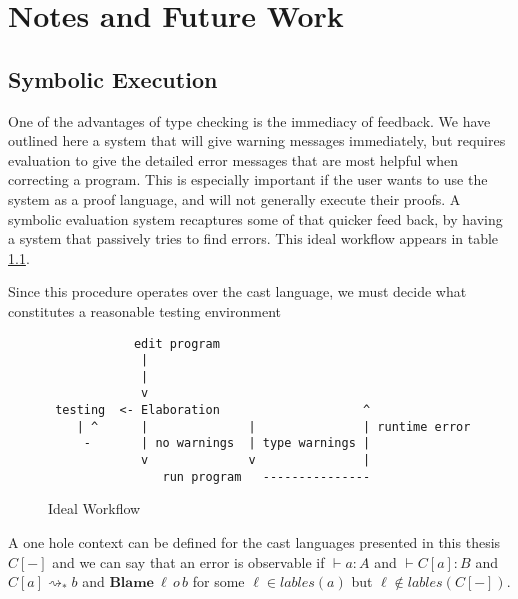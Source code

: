 \chapter{Notes and Future Work}
\label{chapter:CastData}
\thispagestyle{myheadings}


\section{Symbolic Execution}

One of the advantages of type checking is the immediacy of feedback.
We have outlined here a system that will give warning messages immediately,
but requires evaluation to give the detailed error messages that are
most helpful when correcting a program. This is especially important
if the user wants to use the system as a proof language, and will
not generally execute their proofs. A symbolic evaluation system recaptures
some of that quicker feed back, by having a system that passively
tries to find errors. This ideal workflow appears in table \ref{fig:notes-workflow}.

Since this procedure operates over the cast language, we must decide
what constitutes a reasonable testing environment

\begin{figure}
\begin{lstlisting}
            edit program
             |      
             |      
             v
 testing  <- Elaboration                    ^
    | ^      |              |               | runtime error
     -       | no warnings  | type warnings |
             v              v               |
                run program   ---------------
\end{lstlisting}


\caption{Ideal Workflow}
\label{fig:notes-workflow}
\end{figure}

A one hole context can be defined
for the cast languages presented in this thesis $C[-]$ and we can
say that an error is observable if $\vdash a:A$ and $\vdash C[a]:B$
and $C[a]\rightsquigarrow_{*}b$ and $\textbf{Blame}\:\ensuremath{\ell}\,o\,b$
for some $\ensuremath{\ell}\in lables\left(a\right)$ but $\ensuremath{\ell}\notin lables\left(C[-]\right)$.


